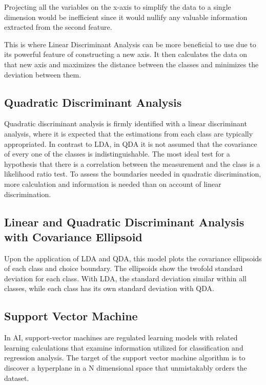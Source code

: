 \documentclass[a4paper,12pt]{report}
\begin{document}

Projecting all the variables on the x-axis to simplify the data to a single dimension would be inefficient since it would nullify any valuable information extracted from the second feature.


This is where Linear Discriminant Analysis can be more beneficial to use due to its powerful feature of constructing a new axis. It then calculates the data on that new axis and maximizes the distance between the classes and minimizes the deviation between them. 


\subsection{Quadratic Discriminant Analysis}
 
Quadratic discriminant analysis is firmly identified with a linear discriminant analysis, where it is expected that the estimations from each class are typically appropriated. In contrast to LDA, in QDA it is not assumed that the covariance of every one of the classes is indistinguishable. The most ideal test for a hypothesis that there is a correlation between the measurement and the class is a likelihood ratio test. To assess the boundaries needed in quadratic discrimination, more calculation and information is needed than on account of linear discrimination.

\subsection{Linear and Quadratic Discriminant Analysis with Covariance Ellipsoid}


Upon the application of LDA and QDA, this model plots the covariance ellipsoids of each class and choice boundary. The ellipsoids show the twofold standard deviation for each class. With LDA, the standard deviation similar within all classes, while each class has its own standard deviation with QDA.

\subsection{Support Vector Machine}
 
In AI, support-vector machines are regulated learning models with related learning calculations that examine information utilized for classification and regression analysis. The target of the support vector machine algorithm is to discover a hyperplane in a N dimensional space that unmistakably orders the dataset.
\end{document}
